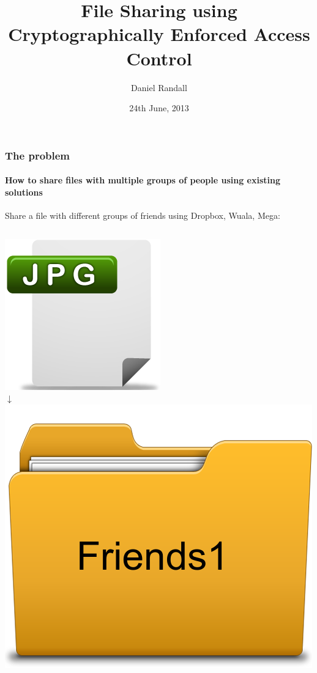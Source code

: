 \documentclass{beamer}
\title{File Sharing using Cryptographically Enforced Access Control}
\author{Daniel Randall}
\institute{Imperial College London}
\date{24th June, 2013}
\begin{document}
\maketitle
  
  \begin{frame}
    \frametitle{The problem}
    \framesubtitle{How to share files with multiple groups of people using existing solutions}
    Share a file with different groups of friends using Dropbox, Wuala, Mega:
    \begin{columns}[t] %
     \begin{column}[T]{3cm}
     \begin{center}
     \includegraphics[scale=0.2]{images/file/jpgicon.png} \\
     $\boldsymbol{\downarrow}$ \\
     \includegraphics[scale=0.15]{images/folder/friends1}
     \end{center}
     \end{column}
     

\end{columns}
\end{frame}
\end{document}
